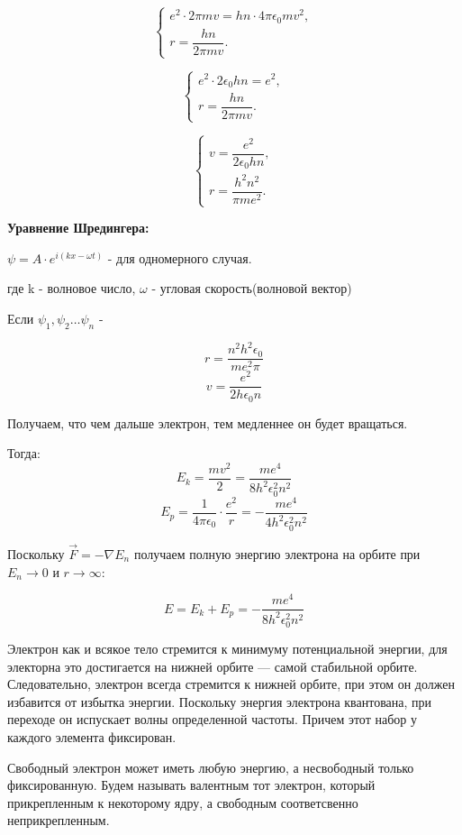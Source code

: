 \documentclass[../main.tex]{subfiles}
\begin{document}
\[
\begin{cases}
e^2 \cdot 2 \pi m v = h n \cdot 4 \pi \epsilon_0 m v^2,\\[4pt]
r = \dfrac{h n}{2 \pi m v}.
\end{cases}
\]

\[
\begin{cases}
e^2 \cdot 2 \epsilon_0 h n = e^2,\\[4pt]
r = \dfrac{h n}{2 \pi m v}.
\end{cases}
\]

\[
\begin{cases}
v = \dfrac{e^2}{2 \epsilon_0 h n},\\[4pt]
r = \dfrac{h^2 n^2}{\pi m e^2}.
\end{cases}
\]

\textbf{Уравнение Шредингера:}


\begin{center}
\(\displaystyle \psi = A \cdot e^{i(kx - \omega t)}\) - для одномерного случая.    
\end{center}



\begin{center}
    где k - волновое число, $\omega$ - угловая скорость(волновой вектор)
\end{center}
Если $\psi_1, \psi_2 \ldots \psi_n$ - 

\[r = \frac{n^2 h^2 \epsilon_0}{m e^2 \pi}\]
\[v = \frac{e^2}{2h \epsilon_0 n}\]

Получаем, что чем дальше электрон, тем медленнее он будет вращаться.

Тогда:
\[E_k = \frac{mv^2}{2} = \frac{me^4}{8h^2 \epsilon_0^2 n^2}\]
\[E_p = \frac{1}{4 \pi \epsilon_0} \cdot \frac{e^2}{r} = - \frac{m e^4}{4 h^2 \epsilon_0^2 n^2}\]

Поскольку $\vec F = - \nabla E_n$ получаем полную энергию электрона на орбите при $E_n \to 0$ и $r \to \infty$:

\[E = E_k + E_p = - \frac{me^4}{8 h^2 \epsilon_0 ^2 n^2}\]

Электрон как и всякое тело стремится к минимуму потенциальной энергии, для электорна это достигается на нижней орбите --- самой стабильной орбите. 
Следовательно, электрон всегда стремится к нижней орбите, при этом он должен избавится от избытка энергии. 
Поскольку энергия электрона квантована, при переходе он испускает волны определенной частоты.
Причем этот набор у каждого элемента фиксирован. 

Свободный электрон может иметь любую энергию, а несвободный только фиксированную.
Будем называть валентным тот электрон, который прикрепленным к некоторому ядру, а свободным соответсвенно неприкрепленным.
\end{document}
